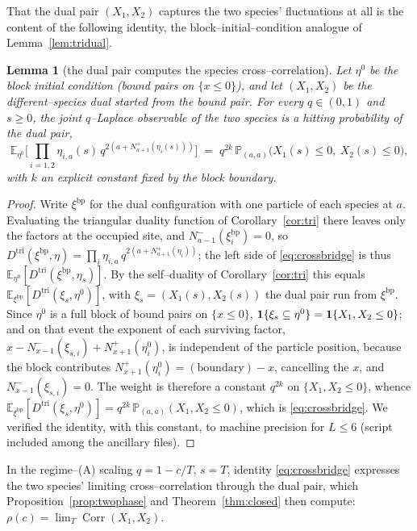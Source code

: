 \documentclass[11pt]{article}
\theoremstyle{plain}
\newtheorem{lemma}[theorem]{Lemma}
\theoremstyle{definition}
\theoremstyle{remark}
\DeclareMathOperator{\Corr}{Corr}\DeclareMathOperator{\cum}{cum}
\newcommand{\E}{\mathbb{E}}\newcommand{\PP}{\mathbb{P}}\newcommand{\dd}{\,\mathrm{d}}
\begin{document}
That the dual pair $(X_1,X_2)$ captures the two species' fluctuations at all is the
content of the following identity, the block--initial--condition analogue of
Lemma~\ref{lem:tridual}.

\begin{lemma}[the dual pair computes the species cross--correlation]\label{lem:crossbridge}
Let $\eta^0$ be the block initial condition (bound pairs on $\{x\le0\}$), and let
$(X_1,X_2)$ be the different--species dual started from the bound pair. For every
$q\in(0,1)$ and $s\ge0$, the joint $q$--Laplace observable of the two species is a
hitting probability of the dual pair,
\begin{equation}\label{eq:crossbridge}
  \E_{\eta^0}\Big[\textstyle\prod_{i=1,2}\eta_{i,a}(s)\,
     q^{2\left(a+N^+_{a+1}(\eta_i(s))\right)}\Big]
   \;=\; q^{2k}\,\PP_{(a,a)}\big(X_1(s)\le0,\ X_2(s)\le0\big),
\end{equation}
with $k$ an explicit constant fixed by the block boundary.
\end{lemma}
\begin{proof}
Write $\xi^{\mathrm{bp}}$ for the dual configuration with one particle of each species at
$a$. Evaluating the triangular duality function of Corollary~\ref{cor:tri} there leaves
only the factors at the occupied site, and $N^-_{a-1}(\xi^{\mathrm{bp}}_i)=0$, so
$D^{\mathrm{tri}}(\xi^{\mathrm{bp}},\eta)=\prod_i\eta_{i,a}\,q^{2(a+N^+_{a+1}(\eta_i))}$;
the left side of \eqref{eq:crossbridge} is thus
$\E_{\eta^0}[D^{\mathrm{tri}}(\xi^{\mathrm{bp}},\eta_s)]$. By the self--duality of
Corollary~\ref{cor:tri} this equals $\E_{\xi^{\mathrm{bp}}}[D^{\mathrm{tri}}(\xi_s,\eta^0)]$,
with $\xi_s=(X_1(s),X_2(s))$ the dual pair run from $\xi^{\mathrm{bp}}$. Since $\eta^0$ is
a full block of bound pairs on $\{x\le0\}$, $\mathbf 1\{\xi_s\subseteq\eta^0\}=\mathbf 1\{X_1,X_2\le0\}$;
and on that event the exponent of each surviving factor,
$x-N^-_{x-1}(\xi_{s,i})+N^+_{x+1}(\eta^0_i)$, is independent of the particle position,
because the block contributes $N^+_{x+1}(\eta^0_i)=(\text{boundary})-x$, cancelling the
$x$, and $N^-_{x-1}(\xi_{s,i})=0$. The weight is therefore a constant $q^{2k}$ on
$\{X_1,X_2\le0\}$, whence
$\E_{\xi^{\mathrm{bp}}}[D^{\mathrm{tri}}(\xi_s,\eta^0)]=q^{2k}\,\PP_{(a,a)}(X_1,X_2\le0)$,
which is \eqref{eq:crossbridge}. We verified the identity, with this constant, to machine
precision for $L\le6$ (script included among the ancillary files).
\end{proof}

In the regime--(A) scaling $q=1-c/T$, $s=T$, identity \eqref{eq:crossbridge} expresses the
two species' limiting cross--correlation through the dual pair, which
Proposition~\ref{prop:twophase} and Theorem~\ref{thm:closed} then compute:
$\rho(c)=\lim_T\Corr(X_1,X_2)$.
\end{document}
